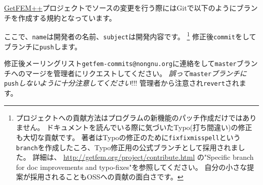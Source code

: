 \documentclass{../../style/ltjoc}
\begin{document}
\href{http://getfem.org}{GetFEM++}プロジェクトでソースの変更を行う際にはGitで以下のようにブランチを作成する規約となっています。
\begin{shbox}
\end{shbox}
ここで、\texttt{name}は開発者の名前、\texttt{subject}は開発内容です。
\footnote{
プロジェクトへの貢献方法はプログラムの新機能のパッチ作成だけではありません。
ドキュメントを読んでいる際に気づいたTypo(打ち間違い)の修正も大切な貢献です。
著者はTypoの修正のために\texttt{fixfixmisspell}という\texttt{branch}を作成したころ、Typo修正用の公式ブランチとして採用されました。
詳細は、 \href{http://getfem.org/project/contribute.html}{http://getfem.org/project/contribute.html} の"Specific branch for doc improvements and typo-fixes"を参照してください。
自分の小さな提案が採用されることもOSSへの貢献の面白さです。
}
修正後\texttt{commit}をしてブランチに\texttt{push}します。
\begin{shbox}
\end{shbox}
修正後メーリングリスト\texttt{getfem-commits@nongnu.org}に連絡をして\texttt{master}ブランチへのマージを管理者にリクエストしてください。
\emph{誤って}\texttt{master}\emph{ブランチに}\texttt{push}\emph{しないように十分注意してください}!!!
管理者から注意され\texttt{revert}されます。
\end{document}
